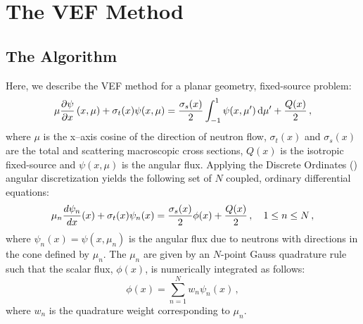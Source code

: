 
\newcommand{\rell}{^\ell} %
\newcommand{\relll}{^{\ell+1}} %
\newcommand{\rellh}{^{\ell+1/2}} %

\newcommand{\paren}[1]{\left(#1\right)} 
\newcommand{\br}[1]{\left[#1\right]}
\newcommand{\curl}[1]{\left\{#1\right\}}

\newcommand{\eddphi}[1]{\edd_{#1}\phi_{#1}}
\newcommand{\ALPHA}[2]{\frac{#1}{\sigma_{t,#2} h_{#2}}}

\section{The VEF Method}
\subsection{The Algorithm}
Here, we describe the VEF method for a planar geometry, fixed-source problem:
	\begin{equation} 
		\mu \pderiv{\psi}{x} \paren{x, \mu} + \sigma_t(x) \psi(x,\mu) = 
			\frac{\sigma_s(x)}{2} \int_{-1}^1 \psi(x,\mu') \ud \mu' + \frac{Q(x)}{2} \,,
	\end{equation}
where $\mu$ is the x--axis cosine of the direction of neutron flow,  $\sigma_t(x)$ and $\sigma_s(x)$ are the total and scattering macroscopic cross sections, $Q(x)$ is the isotropic fixed-source and $\psi(x, \mu)$ is the angular flux. Applying the Discrete Ordinates (\SN) angular discretization yields the following set of $N$ coupled, ordinary differential equations: 
	\begin{equation} \label{eq:sn}
		\mu_n \frac{d \psi_n}{d x}(x) + \sigma_t(x) \psi_n(x) = 
		\frac{\sigma_s(x)}{2} \phi(x) + \frac{Q(x)}{2} \,, \quad 1 \leq n \leq N \,,
	\end{equation}
where $\psi_n(x) = \psi(x, \mu_n)$ is the angular flux due to neutrons with directions in the cone defined by $\mu_n$.  The $\mu_n$ are given by an $N$-point Gauss quadrature rule such that the scalar flux, $\phi(x)$, is numerically integrated as follows: 
	\begin{equation} \label{eq:phiquad}
		\phi(x) = \sum_{n=1}^N w_n \psi_n(x) \,,
	\end{equation}
where $w_n$ is the quadrature weight corresponding to $\mu_n$. 

